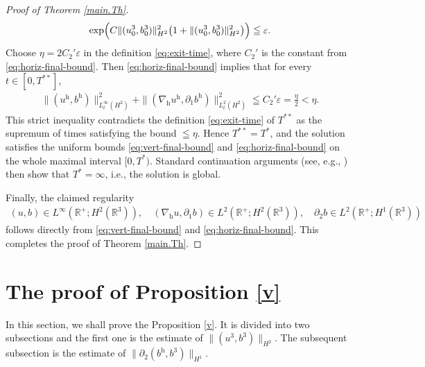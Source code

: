\documentclass[11pt]{amsart}
\theoremstyle{definition}
\newcommand{\h}{\mathrm{h}}
\numberwithin{equation}{section}
\begin{document}
\begin{proof}[Proof of Theorem \ref{main.Th}]
\begin{align*}
		\exp\Bigl(C\|(u^3_0,b^3_0)\|_{H^2}^2\bigl(1+\|(u^3_0,b^3_0)\|_{H^2}^2\bigr)\Bigr)\leqq\varepsilon .
	\end{align*}
	Choose $\eta=2C_2'\varepsilon$ in the definition \eqref{eq:exit-time}, where $C_2'$ is the constant from \eqref{eq:horiz-final-bound}. Then \eqref{eq:horiz-final-bound} implies that for every $t\in[0,T^{**}]$,
	\begin{align*}
		\|(u^\mathrm{h},b^\mathrm{h})\|_{L_{t}^{\infty}(H^2)}^2+\|(\nabla_\mathrm{h}u^\mathrm{h},\partial_1 b^\mathrm{h})\|_{L_{t}^{2}(H^2)}^2 \leqq C_2'\varepsilon = \frac{\eta}{2} < \eta .
	\end{align*}
	This strict inequality contradicts the definition \eqref{eq:exit-time} of $T^{**}$ as the supremum of times satisfying the bound $\leqq\eta$. Hence $T^{**}=T^*$, and the solution satisfies the uniform bounds \eqref{eq:vert-final-bound} and \eqref{eq:horiz-final-bound} on the whole maximal interval $[0,T^*)$. Standard continuation arguments (see, e.g., \cite{06tao}) then show that $T^*=\infty$, i.e., the solution is global.
	
	Finally, the claimed regularity
	\begin{align*}
		(u,b)\in L^\infty(\mathbb{R}^+;H^2(\mathbb{R}^3)),\quad
		(\nabla_\mathrm{h}u,\partial_1b)\in L^2(\mathbb{R}^+;H^2(\mathbb{R}^3)),\quad
		\partial_2b\in L^2(\mathbb{R}^+;H^1(\mathbb{R}^3))
	\end{align*}
	follows directly from \eqref{eq:vert-final-bound} and \eqref{eq:horiz-final-bound}. This completes the proof of Theorem \ref{main.Th}.
\end{proof}

\section{The proof of Proposition \ref{v}}\label{3}
In this section, we shall prove the Proposition \ref{v}. It is divided into two subsections and the first one is the estimate of $\|(u^3,b^3)\|_{H^{2}}$. The subsequent subsection is the estimate of $\|\partial_2 (b^\h,b^3)\|_{H^{1}}$.
\end{document}
